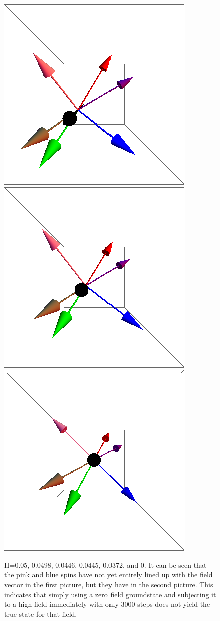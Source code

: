 \documentclass{article}
\begin{document}
\begin{figure}[ht]
\includegraphics[scale=0.27]{100/56S005to000G.png}
\includegraphics[scale=0.27]{100/129S005to000G.png}
\includegraphics[scale=0.27]{100/501S005to000G.png}
\caption{H=0.05, 0.0498, 0.0446, 0.0445, 0.0372, and 0. It can be seen that the pink and blue spins have not yet
entirely lined up with the field vector in the first picture, but they have in the second picture. This indicates that
simply using a zero field groundstate and subjecting it to a high field immediately with only 3000 steps does not yield
the true state for that field.}
\end{figure}
\clearpage
\end{document}
